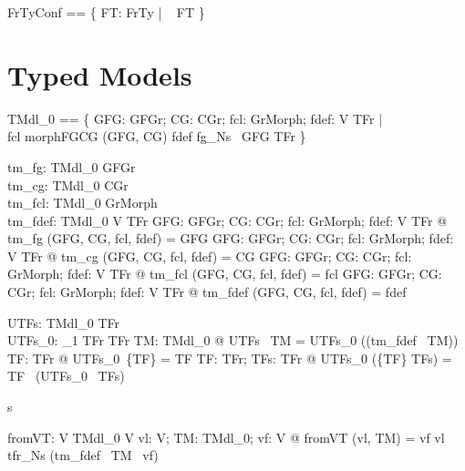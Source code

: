 \begin{zed}
FrTyConf == \{  FT: FrTy | \isConformableF~ FT \}
\end{zed}

\section{Typed Models}

\begin{zed}
TMdl_0 == \{  GFG: GFGr; CG: CGr; fcl: GrMorph; fdef: V \pfun  TFr | \\ \quad 
	fcl \in  morphFGCG (GFG, CG) \land  fdef \in  fg\_Ns~ GFG \fun  TFr \}
\end{zed}

\begin{axdef}
  tm\_fg: TMdl_0 \fun  GFGr\\
  tm\_cg: TMdl_0 \fun  CGr\\
  tm\_fcl: TMdl_0 \fun  GrMorph\\
  tm\_fdef: TMdl_0 \fun  V \pfun  TFr
\where
  \forall  GFG: GFGr; CG: CGr; fcl: GrMorph; fdef: V \pfun  TFr @ tm\_fg (GFG, CG, fcl, fdef) = GFG
\also
  \forall  GFG: GFGr; CG: CGr; fcl: GrMorph; fdef: V \pfun  TFr @ tm\_cg (GFG, CG, fcl, fdef) = CG
\also
  \forall  GFG: GFGr; CG: CGr; fcl: GrMorph; fdef: V \pfun  TFr @ tm\_fcl (GFG, CG, fcl, fdef) = fcl
\also
  \forall  GFG: GFGr; CG: CGr; fcl: GrMorph; fdef: V \pfun  TFr @ tm\_fdef (GFG, CG, fcl, fdef) = fdef
\end{axdef}

\begin{axdef}
  UTFs: TMdl_0 \fun  TFr\\
  UTFs_0: \power_1 TFr \fun  TFr
\where
  \forall  TM: TMdl_0 @ UTFs~ TM = UTFs_0 (\ran  (tm\_fdef~ TM))
 \also
  \forall  TF: TFr @ UTFs_0~\{TF\} = TF
 \also
  \forall  TF: TFr; TFs: \power  TFr @ UTFs_0 (\{TF\} \cup  TFs) = TF~ \UTF (UTFs_0 ~TFs)
\end{axdef}s

\begin{axdef}
  fromVT: V \cross  TMdl_0 \fun  V
\where
  \forall  vl: V; TM: TMdl_0; vf: V @ fromVT (vl, TM) = vf \iff  vl \in  tfr\_Ns (tm\_fdef~ TM ~vf)
\end{axdef}

